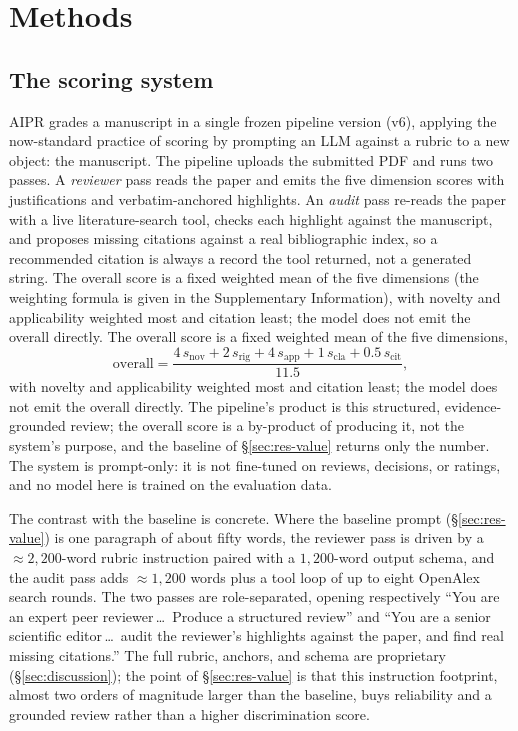\section{Methods}
\label{sec:methods}

\subsection{The scoring system}
\textsc{AIPR} grades a manuscript in a single frozen pipeline version (v6), applying the
now-standard practice of scoring by prompting an LLM against a rubric
\citep{liu2023geval,zheng2023judging} to a new object: the manuscript. The pipeline
uploads the submitted PDF and runs two passes. A \emph{reviewer} pass reads the paper
and emits the five dimension scores with justifications and verbatim-anchored
highlights. An \emph{audit} pass re-reads the paper with a live literature-search tool,
checks each highlight against the manuscript, and proposes missing citations against a
real bibliographic index, so a recommended citation is always a record the tool
returned, not a generated string.
\ifnmibuild
The overall score is a fixed weighted mean of the five dimensions (the weighting formula is
given in the Supplementary Information), with novelty and applicability weighted most and
citation least; the model does not emit the overall directly.
\else
The overall score is a fixed weighted mean of the five
dimensions,
\begin{equation}
  \text{overall} = \frac{4\,s_{\text{nov}} + 2\,s_{\text{rig}}
  + 4\,s_{\text{app}} + 1\,s_{\text{cla}} + 0.5\,s_{\text{cit}}}{11.5},
  \label{eq:overall}
\end{equation}
with novelty and applicability weighted most and citation least; the model does not emit
the overall directly.
\fi The pipeline's product is this structured, evidence-grounded
review; the overall score is a by-product of producing it, not the system's purpose, and
the baseline of \S\ref{sec:res-value} returns only the number. The system is prompt-only:
it is not fine-tuned on reviews, decisions, or ratings, and no model here is trained on
the evaluation data.

The contrast with the baseline is concrete. Where the baseline prompt
(\S\ref{sec:res-value}) is one paragraph of about fifty words, the reviewer pass is
driven by a ${\approx}2{,}200$-word rubric instruction paired with a $1{,}200$-word
output schema, and the audit pass adds ${\approx}1{,}200$ words plus a tool loop of up to
eight OpenAlex search rounds. The two passes are role-separated, opening respectively
``You are an expert peer reviewer\,\ldots\ Produce a structured review'' and ``You are a
senior scientific editor\,\ldots\ audit the reviewer's highlights against the paper, and
find real missing citations.'' The full rubric, anchors, and schema are proprietary
(\S\ref{sec:discussion}); the point of \S\ref{sec:res-value} is that this instruction
footprint, almost two orders of magnitude larger than the baseline, buys reliability and
a grounded review rather than a higher discrimination score.

